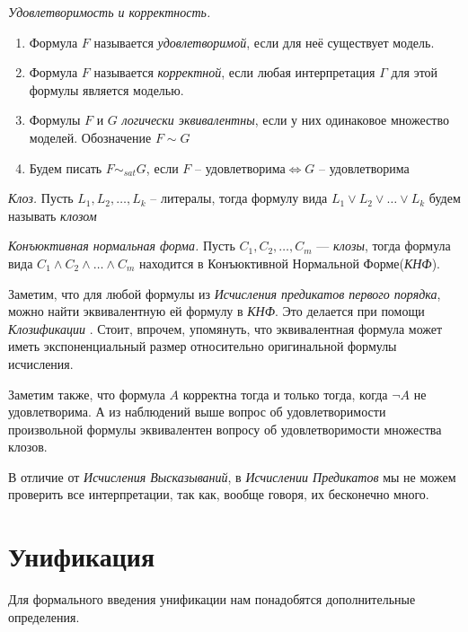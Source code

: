 \begin{definition}
  \emph{Удовлетворимость и корректность.} 
  \begin{enumerate}
  	\item Формула $F$ называется \textit{удовлетворимой}, если для неё существует модель.
  	\item Формула $F$ называется \textit{корректной}, если любая интерпретация $\Gamma$ для этой формулы является моделью.
  	\item Формулы $F$ и $G$ \textit{логически эквивалентны}, если у них одинаковое множество моделей. Обозначение $F \sim G$
  	\item Будем писать $F \sim_{sat} G$, если $F \text{ -- удовлетворима} \iff G \text{ -- удовлетворима}$
  \end{enumerate}
\end{definition}

\begin{definition}
  \emph{Клоз.} Пусть $L_1, L_2, \ldots, L_k$ -- литералы, тогда формулу вида $L_1 \vee L_2 \vee \dots \vee L_k$ будем называть \emph{клозом}
\end{definition}

\begin{definition}
  \emph{Конъюктивная нормальная форма.} Пусть $C_1, C_2, \ldots, C_m$ --- \emph{клозы}, тогда формула вида $C_1 \wedge C_2 \wedge \dots \wedge C_m$ находится в Конъюктивной Нормальной Форме(\emph{КНФ}).
\end{definition}

Заметим, что для любой формулы из \emph{Исчисления предикатов первого порядка}, можно найти эквивалентную ей формулу в \emph{КНФ}. Это делается при помощи \textit{Клозификации} \cite{clausification}. Стоит, впрочем, упомянуть, что эквивалентная формула может иметь экспоненциальный размер относительно оригинальной формулы исчисления.

Заметим также, что формула $A$ корректна тогда и только тогда, когда $\neg A$ не удовлетворима. А из наблюдений выше вопрос об удовлетворимости произвольной формулы эквивалентен вопросу об удовлетворимости множества клозов. 

В отличие от \textit{Исчисления Высказываний}, в \textit{Исчислении Предикатов} мы не можем проверить все интерпретации, так как, вообще говоря, их бесконечно много.\\

\section{Унификация}
Для формального введения унификации нам понадобятся дополнительные определения.

